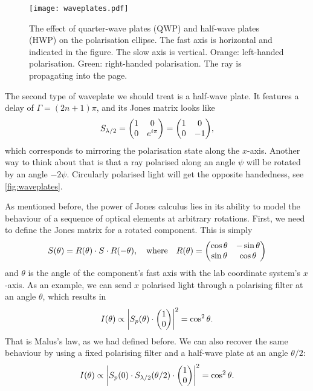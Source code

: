\begin{figure}
	\centering
	\texttt{[image: waveplates.pdf]}
	\caption{
		The effect of quarter-wave plates (QWP) and half-wave plates (HWP) on the polarisation ellipse. The fast axis is horizontal and indicated in the figure. The slow axis is vertical. Orange: left-handed polarisation. Green: right-handed polarisation. The ray is propagating into the page.
	}
	\label{fig:waveplates}
\end{figure}

The second type of waveplate we should treat is a half-wave plate. It features a delay of $ \Gamma = (2n+1)\pi $, and its Jones matrix looks like
\begin{equation}
	S_\hwp = \mqty(1 & 0 \\ 0 & e^{i\pi}) = \mqty(1 & 0 \\ 0 & -1),
\end{equation}
which corresponds to mirroring the polarisation state along the $ x $-axis. Another way to think about that is that a ray polarised along an angle $ \psi $ will be rotated by an angle $ -2\psi $. Circularly polarised light will get the opposite handedness, see \autoref{fig:waveplates}.

As mentioned before, the power of Jones calculus lies in its ability to model the behaviour of a sequence of optical elements at arbitrary rotations. First, we need to define the Jones matrix for a rotated component. This is simply
\begin{equation}
	S(\theta) = R(\theta) \cdot S \cdot R(-\theta),
	\qq{where} 
	R(\theta) = \mqty(\cos\theta & -\sin\theta \\ \sin\theta & \cos\theta)
\end{equation}
and $ \theta $ is the angle of the component's fast axis with the lab coordinate system's $ x $-axis. As an example, we can send $ x $ polarised light through a polarising filter at an angle $ \theta $, which results in
\begin{equation}
	I(\theta) \propto \abs{S_p(\theta) \cdot \mqty(1 \\ 0)}^2 = \cos^2\theta.
\end{equation}
That is Malus's law, as we had defined before. We can also recover the same behaviour by using a fixed polarising filter and a half-wave plate at an angle $ \theta/2 $:
\begin{equation}
	I(\theta) \propto \abs{S_p(0) \cdot S_\hwp(\theta/2) \cdot \mqty(\admat{1 \\ 0})}^2 = \cos^2\theta.
\end{equation}

